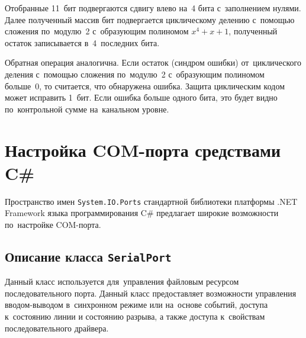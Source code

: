 \documentclass[a4paper,12pt]{article}
\begin{document}
Отобранные 11~бит подвергаются сдвигу влево на~4 бита с~заполнением нулями. Далее полученный массив бит подвергается циклическому делению с~помощью сложения по~модулю~2 с~образующим полиномом $x^4+x+1$, полученный остаток записывается в~4~последних бита.

Обратная операция аналогична. Если остаток (синдром ошибки) от~циклического деления с~помощью сложения по~модулю~2 с~образующим полиномом больше~0, то считается, что обнаружена ошибка. Защита циклическим кодом может исправить 1~бит. Если ошибка больше одного бита, это будет видно по~контрольной сумме на~канальном уровне.

\section{Настройка COM-порта средствами C\#}
Пространство имен \texttt{System.IO.Ports} стандартной библиотеки платформы .NET Framework языка программирования C\# предлагает широкие возможности по~настройке COM-порта.

\subsection{Описание класса \texttt{SerialPort}}
Данный класс используется для~управления файловым ресурсом последовательного порта. Данный класс предоставляет возможности управления вводом-выводом в~синхронном режиме или на~основе событий, доступа к~состоянию линии и состоянию разрыва, а также доступа к~свойствам последовательного драйвера.
\end{document}
